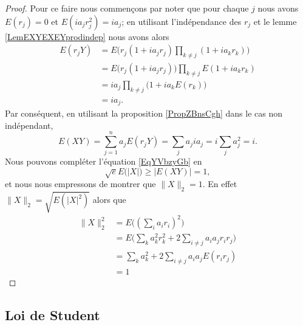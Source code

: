 \begin{proof}
   Pour ce faire nous commençons par noter que pour chaque \( j\) nous avons \( E(r_j)=0\) et \( E(ia_jr_j^2)=ia_j\); en utilisant l'indépendance des \( r_j\) et le lemme \ref{LemEXYEXEYprodindep} nous avons alors
   \begin{subequations}
       \begin{align}
           E(r_jY)&=E\Big( r_j(1+ia_jr_j)\prod_{k\neq j}(1+ia_kr_k) \Big)\\
           &=E\big( r_j(1+ia_jr_j) \big)\prod_{k\neq j}E(1+ia_kr_k)\\
           &=ia_j\prod_{k\neq j}\big( 1+ia_kE(r_k) \big)\\
           &=ia_j.
       \end{align}
   \end{subequations}
   Par conséquent, en utilisant la proposition \ref{PropZBnsCgh} dans le cas non indépendant,
   \begin{equation}
       E(XY)=\sum_{j=1}^na_jE(r_jY)=\sum_ja_jia_j=i\sum_ja_j^2=i.
   \end{equation}
   Nous pouvons compléter l'équation \eqref{EqYVbzyGb} en
   \begin{equation} 
       \sqrt{e}E\big( | X | \big)\geq \big| E(XY) \big|=1,
   \end{equation}
   et nous nous empressons de montrer que \( \| X \|_2=1\). En effet \( \| X \|_2=\sqrt{E(| X |^2)}\) alors que
   \begin{subequations}
       \begin{align}
           \| X \|_2^2&=E\big( (\sum_ia_ir_i)^2 \big)\\
           &=E\Big( \sum_ka_k^2r_k^2+2\sum_{i\neq j}a_ia_jr_ir_j \Big)\\
           &=\sum_ka_k^2+2\sum_{i\neq j}a_ia_jE(r_ir_j)\\
           &=1
       \end{align}
   \end{subequations}
\end{proof}

\subsection{Loi de Student}

